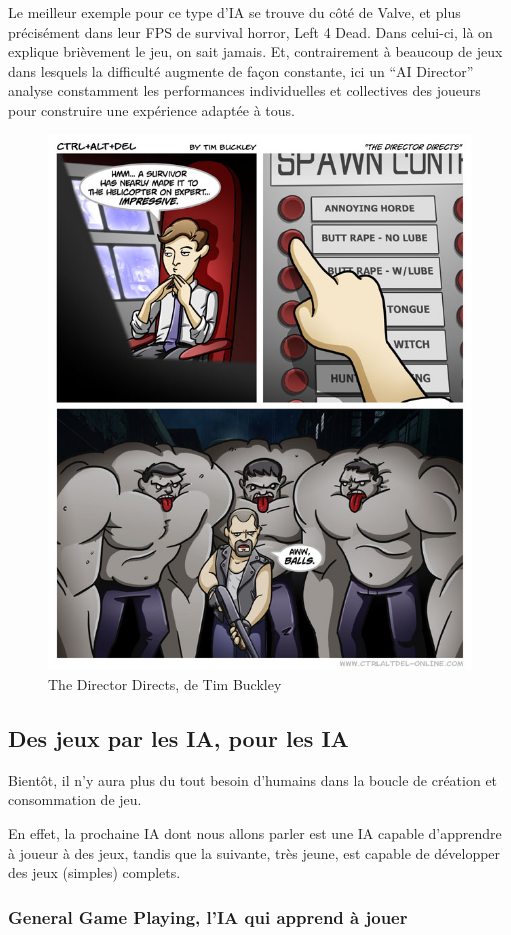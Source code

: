 \documentclass[a4paper, 12pt]{article} %
\begin{document}
Le meilleur exemple pour ce type d’IA se trouve du côté de Valve, et plus précisément dans leur FPS de survival horror, Left 4 Dead. Dans celui-ci, là on explique brièvement le jeu, on sait jamais. Et, contrairement à beaucoup de jeux dans lesquels la difficulté augmente de façon constante, ici un “AI Director” analyse constamment les performances individuelles et collectives des joueurs pour construire une expérience adaptée à tous.

\begin{figure}[!h]%
	\begin{center} 
		\includegraphics[width=0.60\columnwidth]{images/aiDirector.png}%
		\caption{The Director Directs, de Tim Buckley}%
	\end{center}
\end{figure}

\newpage
\subsection{Des jeux par les IA, pour les IA}

Bientôt, il n’y aura plus du tout besoin d’humains dans la boucle de création et consommation de jeu.

En effet, la prochaine IA dont nous allons parler est une IA capable d’apprendre à joueur à des jeux, tandis que la suivante, très jeune, est capable de développer des jeux (simples) complets.

\subsubsection{General Game Playing, l'IA qui apprend à jouer}
\end{document}
